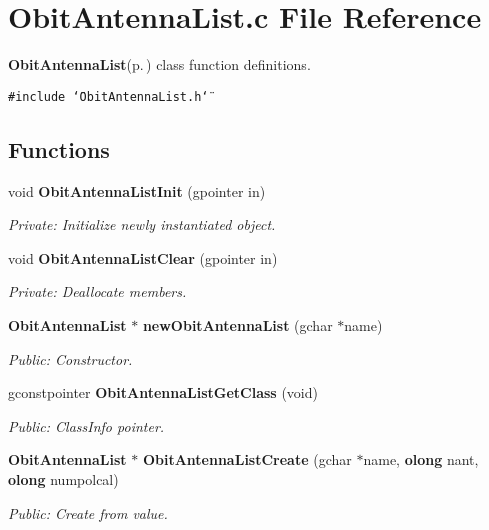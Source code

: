 \section{Obit\-Antenna\-List.c File Reference}
\label{ObitAntennaList_8c}
{\bf Obit\-Antenna\-List}{\rm (p.\,\pageref{structObitAntennaList})} class function definitions. 

{\tt \#include \char`\"{}Obit\-Antenna\-List.h\char`\"{}}\par
\subsection*{Functions}
\begin{CompactItemize}
\item 
void {\bf Obit\-Antenna\-List\-Init} (gpointer in)
\begin{CompactList}\small\item\em Private: Initialize newly instantiated object. \item\end{CompactList}\item 
void {\bf Obit\-Antenna\-List\-Clear} (gpointer in)
\begin{CompactList}\small\item\em Private: Deallocate members. \item\end{CompactList}\item 
{\bf Obit\-Antenna\-List} $\ast$ {\bf new\-Obit\-Antenna\-List} (gchar $\ast$name)
\begin{CompactList}\small\item\em Public: Constructor. \item\end{CompactList}\item 
gconstpointer {\bf Obit\-Antenna\-List\-Get\-Class} (void)
\begin{CompactList}\small\item\em Public: Class\-Info pointer. \item\end{CompactList}\item 
{\bf Obit\-Antenna\-List} $\ast$ {\bf Obit\-Antenna\-List\-Create} (gchar $\ast$name, {\bf olong} nant, {\bf olong} numpolcal)
\begin{CompactList}\small\item\em Public: Create from value. \item\end{CompactList}\item 

\end{CompactItemize}
